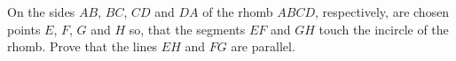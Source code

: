 \problem{}
On the sides $AB$, $BC$, $CD$ and $DA$ of the rhomb $ABCD$, respectively, are chosen points $E$, $F$, $G$ and $H$ so, that the segments $EF$ and $GH$ touch the incircle of the rhomb.
Prove that the lines $EH$ and $FG$ are parallel.
\solution
\endproblem
